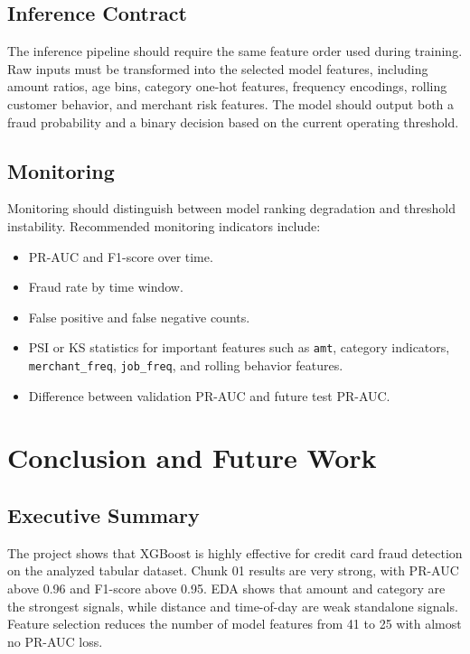 \documentclass[12pt,a4paper]{article}
\begin{document}
\subsection{Inference Contract}

The inference pipeline should require the same feature order used during training. Raw inputs must be transformed into the selected model features, including amount ratios, age bins, category one-hot features, frequency encodings, rolling customer behavior, and merchant risk features. The model should output both a fraud probability and a binary decision based on the current operating threshold.

\subsection{Monitoring}

Monitoring should distinguish between model ranking degradation and threshold instability. Recommended monitoring indicators include:
\begin{itemize}
    \item PR-AUC and F1-score over time.
    \item Fraud rate by time window.
    \item False positive and false negative counts.
    \item PSI or KS statistics for important features such as \texttt{amt}, category indicators, \texttt{merchant\_freq}, \texttt{job\_freq}, and rolling behavior features.
    \item Difference between validation PR-AUC and future test PR-AUC.
\end{itemize}

\section{Conclusion and Future Work}

\subsection{Executive Summary}

The project shows that XGBoost is highly effective for credit card fraud detection on the analyzed tabular dataset. Chunk 01 results are very strong, with PR-AUC above 0.96 and F1-score above 0.95. EDA shows that amount and category are the strongest signals, while distance and time-of-day are weak standalone signals. Feature selection reduces the number of model features from 41 to 25 with almost no PR-AUC loss.
\end{document}
